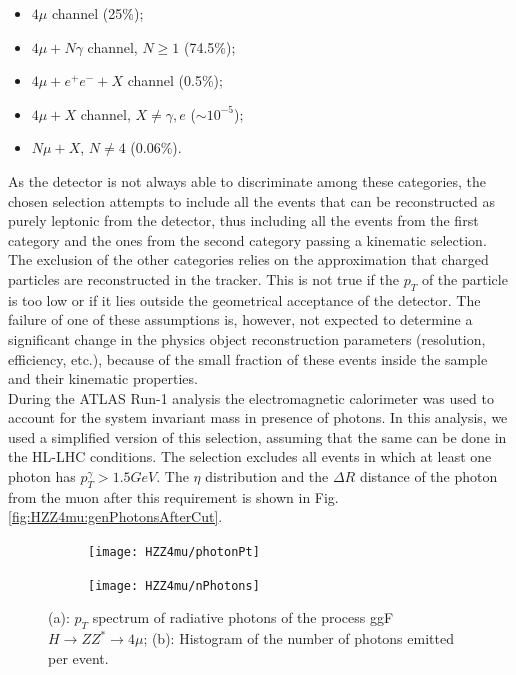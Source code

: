 \documentclass[a4paper,twoside,12pt]{book}
\begin{document}
\begin{itemize}
\item $4\mu$ channel (25\%);
\item $4\mu + N\gamma$ channel, $N \geq 1$ (74.5\%);
\item $4\mu + e^+e^- + X$ channel (0.5\%);
\item $4\mu + X$ channel, $X \neq \gamma, e$ ($\sim 10^{-5}$);
\item $N\mu + X$, $N \neq 4$ (0.06\%).
\end{itemize}

As the detector is not always able to discriminate among these categories, the chosen selection attempts to include all the events that can be reconstructed as purely leptonic from
the detector, thus including all the events
from the first category and the ones from the second category passing a kinematic 
selection. The exclusion of the other categories relies on the approximation that charged
particles are reconstructed in the tracker. This is not true if the $p_{T}$ of the particle is 
too low or if it lies outside the geometrical acceptance of the detector. The failure of one 
of these assumptions is, however, not expected to determine a significant change in the
physics object reconstruction parameters (resolution, efficiency, etc.), because of the
small fraction of these events inside the sample and their kinematic properties. \\

During the ATLAS Run-1 analysis the electromagnetic calorimeter was used to account for the system invariant mass in presence of photons\cite{HZZ4mu_run1}. In
this analysis, we used a simplified version of this selection, assuming that the same
can be done in the HL-LHC conditions. The selection excludes all events in which at least one photon has $p_{T}^{\gamma} > 1.5 GeV$. The $\eta$ distribution
and the $\Delta R$ distance of the photon from the muon after this requirement is shown in Fig.\ref{fig:HZZ4mu:genPhotonsAfterCut}.\\

\begin{figure}
\centering
\begin{subfigure}{.5\textwidth}
  \centering
  \texttt{[image: HZZ4mu/photonPt]}
  \caption{}
  \label{fig:HZZ4mu:photonPt}
\end{subfigure}%
\begin{subfigure}{.5\textwidth}
  \centering
  \texttt{[image: HZZ4mu/nPhotons]}
  \caption{}
  \label{fig:HZZ4mu:nPhotons}
\end{subfigure}
\caption{(a): $p_T$ spectrum of radiative photons of the process 
	ggF $H \rightarrow ZZ^* \rightarrow 4\mu$; 
	(b): Histogram of the number of photons emitted per event.}
\label{fig:HZZ4mu:genPhotons}
\end{figure}
\end{document}
